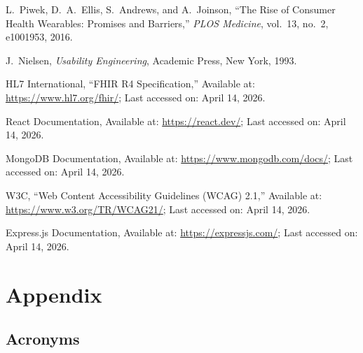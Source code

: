\documentclass[12pt,a4paper]{report}
\begin{document}
\noindent[8] L.\ Piwek, D.\ A.\ Ellis, S.\ Andrews, and A.\ Joinson, ``The Rise of Consumer Health Wearables: Promises and Barriers,'' \textit{PLOS Medicine}, vol.\ 13, no.\ 2, e1001953, 2016.

\noindent[9] J.\ Nielsen, \textit{Usability Engineering}, Academic Press, New York, 1993.

\noindent[10] HL7 International, ``FHIR R4 Specification,'' Available at: \url{https://www.hl7.org/fhir/}; Last accessed on: April 14, 2026.

\noindent[11] React Documentation, Available at: \url{https://react.dev/}; Last accessed on: April 14, 2026.

\noindent[12] MongoDB Documentation, Available at: \url{https://www.mongodb.com/docs/}; Last accessed on: April 14, 2026.

\noindent[13] W3C, ``Web Content Accessibility Guidelines (WCAG) 2.1,'' Available at: \url{https://www.w3.org/TR/WCAG21/}; Last accessed on: April 14, 2026.

\noindent[14] Express.js Documentation, Available at: \url{https://expressjs.com/}; Last accessed on: April 14, 2026.

\endgroup

\appendix
\chapter{Appendix}

\section{Acronyms}
\end{document}
